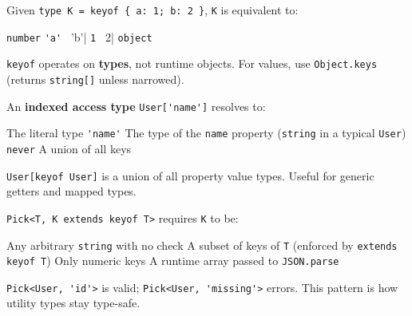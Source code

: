 \question[4]
Given \lstinline[style=tsinline]|type K = keyof { a: 1; b: 2 }|, \lstinline[style=tsinline]|K| is equivalent to:
\begin{choices}
  \choice \lstinline[style=tsinline]|number|
  \CorrectChoice \lstinline[style=tsinline]|'a' | 'b'|
  \choice \lstinline[style=tsinline]|1 | 2|
  \choice \lstinline[style=tsinline]|object|
\end{choices}
\begin{solution}
  \lstinline[style=tsinline]|keyof| operates on \textbf{types}, not runtime objects. For values, use \lstinline[style=tsinline]|Object.keys| (returns \lstinline[style=tsinline]|string[]| unless narrowed).
\end{solution}

\question[4]
An \textbf{indexed access type} \lstinline[style=tsinline]|User['name']| resolves to:
\begin{choices}
  \choice The literal type \lstinline[style=tsinline]|'name'|
  \CorrectChoice The type of the \lstinline[style=tsinline]|name| property (\lstinline[style=tsinline]|string| in a typical \lstinline[style=tsinline]|User|)
  \choice \lstinline[style=tsinline]|never|
  \choice A union of all keys
\end{choices}
\begin{solution}
  \lstinline[style=tsinline]|User[keyof User]| is a union of all property value types. Useful for generic getters and mapped types.
\end{solution}

\question[4]
\lstinline[style=tsinline]|Pick<T, K extends keyof T>| requires \lstinline[style=tsinline]|K| to be:
\begin{choices}
  \choice Any arbitrary \lstinline[style=tsinline]|string| with no check
  \CorrectChoice A subset of keys of \lstinline[style=tsinline]|T| (enforced by \lstinline[style=tsinline]|extends keyof T|)
  \choice Only numeric keys
  \choice A runtime array passed to \lstinline[style=tsinline]|JSON.parse|
\end{choices}
\begin{solution}
  \lstinline[style=tsinline]|Pick<User, 'id'>| is valid; \lstinline[style=tsinline]|Pick<User, 'missing'>| errors. This pattern is how utility types stay type-safe.
\end{solution}

